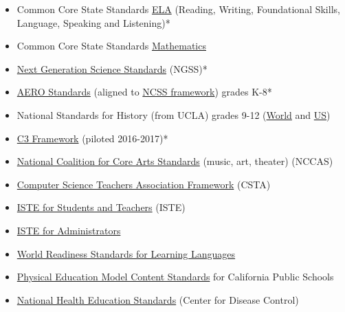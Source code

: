 \begin{findings}
\begin{itemize}
\item Common Core State Standards \href{https://drive.google.com/a/cmis.ac.th/file/d/0B71_pYxcTLo-Y1FGYl9JeUotbXc/view?usp=sharing}{ELA} (Reading, Writing, Foundational Skills, Language, Speaking and Listening)*
\item Common Core State Standards \href{https://drive.google.com/drive/folders/0B71_pYxcTLo-MkJPLU5tQk1ySWM?usp=sharing}{Mathematics}
\item \href{https://drive.google.com/drive/folders/0ByVFfrm0zfolN01lX0hnejZ4Q0U?usp=sharing}{Next Generation Science Standards} (NGSS)*
\item \href{https://drive.google.com/drive/folders/0ByVFfrm0zfolMjlnc0JtcVRVYjA?usp=sharing}{AERO Standards} (aligned to \href{http://www.socialstudies.org/standards/strands}{NCSS framework}) grades K-8*
\item National Standards for History (from UCLA) grades 9-12 (\href{http://www.nchs.ucla.edu/history-standards/world-history-content-standards}{World} and \href{http://www.nchs.ucla.edu/history-standards/us-history-content-standards}{US})
\item \href{https://drive.google.com/a/cmis.ac.th/file/d/0ByVFfrm0zfolbG9hN21kR2FXZVU/view?usp=sharing}{C3 Framework} (piloted 2016-2017)*
\item \href{https://drive.google.com/drive/folders/0B71_pYxcTLo-NDhTcTJLQU82WVU?usp=sharing}{National Coalition for Core Arts Standards} (music, art, theater)  (NCCAS)
\item \href{https://drive.google.com/a/cmis.ac.th/file/d/0B71_pYxcTLo-U1BYR3JXMUZhUW8/view?usp=sharing}{Computer Science Teachers Association Framework} (CSTA)
\item \href{https://drive.google.com/a/cmis.ac.th/file/d/0ByVFfrm0zfolakw5TUstQ1ZrVDFCRjR1d1JQSUpQbkZaVDBr/view?usp=sharing}{ISTE for Students and Teachers} (ISTE)
\item \href{https://www.iste.org/standards/standards/standards-for-administrators}{ISTE for Administrators} 
\item \href{https://drive.google.com/drive/folders/0ByVFfrm0zfolfk9CLWctcnk2RlJYX1RaWGpkZktWRTR2MVQ5aEQ0SGg0R280VGV5Tm81bm8?usp=sharing}{World Readiness Standards for Learning Languages}
\item \href{https://drive.google.com/a/cmis.ac.th/file/d/0ByVFfrm0zfolOE8wcTR5Y19BZms/view?usp=sharing}{Physical Education Model Content Standards} for California Public Schools 
\item \href{https://drive.google.com/drive/folders/0ByVFfrm0zfolfmJGZ3B1anNJc0hNTTZobHlKMXBFbTlDQUVvMXNQQVhUWklocUd0VGY3eTg?usp=sharing}{National Health Education Standards} (Center for Disease Control)

\end{itemize}
\end{findings}
